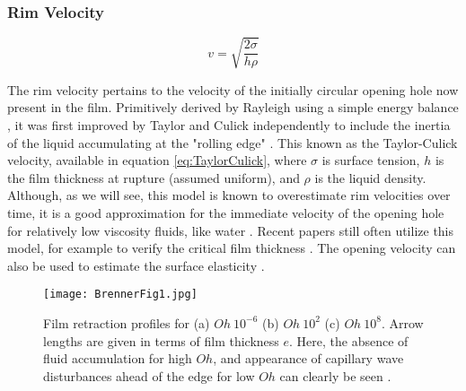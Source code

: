 \documentclass[a4paper,12pt]{article}
\numberwithin{equation}{section}
\numberwithin{figure}{section}
\numberwithin{table}{section}
\begin{document}
\subsubsection{Rim Velocity}

\begin{equation}
    \label{eq:TaylorCulick}
    v = \sqrt{\frac{2 \sigma}{h \rho}}
\end{equation}

The rim velocity pertains to the velocity of the initially circular opening hole now present in the film. Primitively derived by Rayleigh using a simple energy balance \cite{Rayleigh1902}, it was first improved by Taylor and Culick independently to include the inertia of the liquid accumulating at the "rolling edge" \cite{Taylor1959, Culick1960}. This known as the Taylor-Culick velocity, available in equation \ref{eq:TaylorCulick}, where $\sigma$ is surface tension, $h$ is the film thickness at rupture (assumed uniform), and $\rho$ is the liquid density. Although, as we will see, this model is known to overestimate rim velocities over time, it is a good approximation for the immediate velocity of the opening hole for relatively low viscosity fluids, like water \cite{Brenner1999, Lhuissier2011}. Recent papers still often utilize this model, for example to verify the critical film thickness \cite{Modini2013, Debregeas1998}. The opening velocity can also be used to estimate the surface elasticity \cite{Petit2015}.

\begin{figure}[!htbp]
    \centering
    \captionsetup{width=.9\linewidth}
    \texttt{[image: BrennerFig1.jpg]}
    \caption{Film retraction profiles for (a) $Oh ~ 10^{-6}$ (b) $Oh~ 10^{2}$ (c) $Oh~ 10^{8}$. Arrow lengths are given in terms of film thickness $e$. Here, the absence of fluid accumulation for high $Oh$, and appearance of capillary wave disturbances ahead of the edge for low $Oh$ can clearly be seen \cite{Brenner1999}.}
    \label{fig:Brenner1}
\end{figure}
\end{document}
